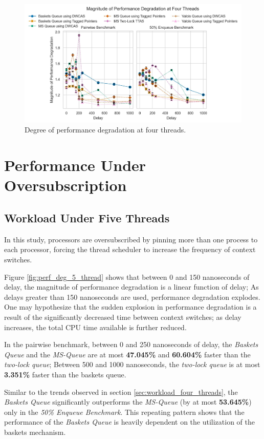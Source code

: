 \begin{figure}[!ht]
    \centering
    \includegraphics[width=1\textwidth]{images/plots/speedup_3.jpg}
    \caption{Degree of performance degradation at four threads.}
    \label{fig:perf_deg_4_thread}
\end{figure}

\pagebreak

\section{Performance Under Oversubscription}
\subsection{Workload Under Five Threads}
In this study, processors are oversubscribed by pinning more than one process
to each processor, forcing the thread scheduler to increase the frequency of
context switches.

Figure \ref{fig:perf_deg_5_thread} shows that between 0 and 150 nanoseconds of delay, the
magnitude of performance degradation is a linear function of delay; As delays
greater than 150 nanoseconds are used, performance degradation explodes.
One may hypothesize that the sudden explosion in performance degradation is a result of
the significantly decreased time between context switches; as delay increases, 
the total CPU time available is further reduced.

In the pairwise benchmark, between 0 and 250 nanoseconds of delay, the \emph{Baskets
Queue} and the \emph{MS-Queue} are at most
\textbf{47.045\%} and \textbf{60.604\%} faster than the \emph{two-lock queue};
Between 500 and 1000 nanoseconds, the \emph{two-lock queue} is at most \textbf{3.351\%}
faster than the baskets queue.

Similar to the trends observed in section \ref{sec:workload_four_threads}, the \emph{Baskets
Queue} significantly outperforms the \emph{MS-Queue} (by at most \textbf{53.645\%}) only
in the \emph{50\% Enqueue Benchmark}. This repeating pattern shows that the performance of the
\emph{Baskets Queue} is heavily dependent on the utilization of the baskets mechanism.

